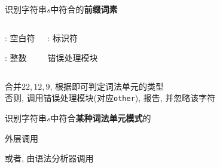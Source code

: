 \begin{frame}{}
  \begin{center}
    识别字符串$s$中符合的{\bf 前缀词素} 
  \end{center}

  \begin{columns}
      \begin{center}
        \ws: 空白符

        \vspace{0.20cm}
        \intnum: 整数
      \end{center}
      \begin{center}
        \id: 标识符

        \vspace{0.40cm}
        错误处理模块
      \end{center}
  \end{columns}

  \pause
  \vspace{0.30cm}
  \begin{center}
     合并$22, 12, 9$, 根据即可判定词法单元的类型 \\[8pt]
    否则, 调用错误处理模块(对应\texttt{other}), 报告, 并忽略该字符
  \end{center}
\end{frame}

\begin{frame}{}
\end{frame}

\begin{frame}{}
\end{frame}

\begin{frame}{}
  \begin{center}
    识别字符串$s$中符合{\bf 某种词法单元模式}的

    \vspace{1.00cm}
    外层调用 

    \vspace{0.60cm}
    或者, 由语法分析器调用 

    \vspace{0.20cm}
  \end{center}
\end{frame}

